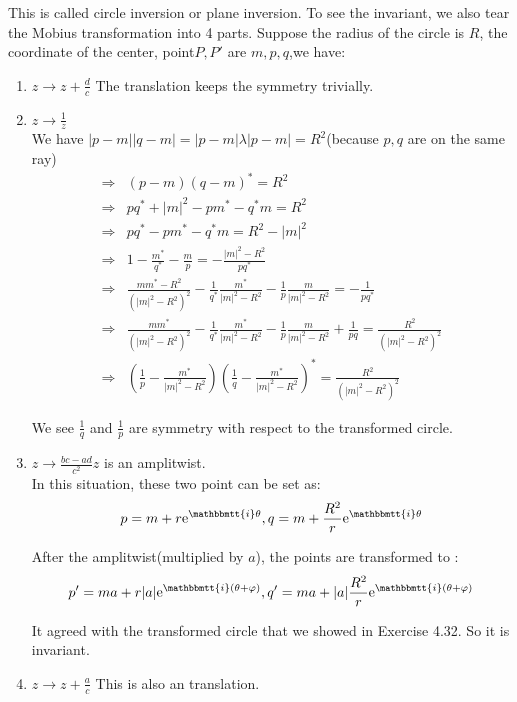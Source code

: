 \documentclass[]{ctexart}
\newcommand{\mi}{\mathbbmtt{i}}
\newcommand{\me}{\mathrm{e}}
\begin{document}
		This is called circle inversion or plane inversion. To see the invariant, we also tear the Mobius transformation into 4 parts. Suppose the radius of the circle is $R$, the coordinate of the center, point$P,P'$ are $m,p,q$,we have:
			\begin{enumerate}
				\item $z\rightarrow z+\frac{d}{c}$ The translation keeps the symmetry trivially. 
				\item $z\rightarrow \frac{1}{z}$\\
				 We have $ |p-m||q-m|= |p-m|\lambda|p-m|=R^2 $(because $p,q$ are on the same ray)\\
				 	\begin{equation*}
				 	\begin{aligned}
				 		\Rightarrow& (p-m)(q-m)^*=R^2\\
				 		\Rightarrow& p q^{*}+|m|^{2}-p m^{*}-q^{*} m=R^{2} \\
				 		\Rightarrow& p q^{*}-p m^{*}-q^{*} m=R^{2}-|m|^{2} \\
				 		\Rightarrow& 1-\frac{m^{*}}{q^{*}}-\frac{m}{p}=-\frac{|m|^{2}-R^{2}}{p q^{*}} \\
				 		\Rightarrow& \frac{m m^{*}-R^{2} }{\left(|m|^{2}-R^{2}\right)^{2}}-\frac{1}{q^{*}} \frac{m^{*}}{|m|^{2}-R^{2}}-\frac{1}{p} \frac{m}{|m|^{2}-R^{2}}=-\frac{1}{p q^{*}} \\
				 		\Rightarrow& \frac{m m^{*}}{\left(|m|^{2}-R^{2}\right)^{2}}-\frac{1}{q^{*}} \frac{m^{*}}{|m|^{2}-R^{2}}-\frac{1}{p} \frac{m}{|m|^{2}-R^{2}}+\frac{1}{p q}=\frac{R^{2}}{\left(|m|^{2}-R^{2}\right)^{2}} \\
				 		\Rightarrow& \left(\frac{1}{p}-\frac{m^{*}}{|m|^{2}-R^{2}}\right)\left(\frac{1}{q}-\frac{m^{*}}{| m|^{2}-R^{2}}\right)^{*}=\frac{R^{2}}{\left(|m|^{2}-R^{2}\right)^{2}}
				 	\end{aligned}
				 	\end{equation*}
				 	
				 	We see $\frac{1}{q}$ and $\frac{1}{p}$ are symmetry with respect to the transformed circle.  
				 	
				\item $z\rightarrow \frac{bc-ad}{c^2}z$ is an amplitwist. \\
				In this situation, these two point can be set as: 
					\begin{equation*}
						p=m+r\me^{\mi \theta},q=m+\frac{R^2}{r}\me^{\mi \theta}
					\end{equation*}
				
				After the amplitwist(multiplied by $a$), the points are transformed to :
					\begin{equation*}
					\begin{aligned}
						p'=ma+r|a|\me^{\mi (\theta+\varphi)},q'=ma+|a|\frac{R^2}{r}\me^{\mi (\theta+\varphi)}
					\end{aligned}
					\end{equation*}
					
				It agreed with the transformed circle that we showed in Exercise 4.32. So it is invariant. 
				\item $z\rightarrow  z+\frac{a}{c}$ This is also an translation. 
			\end{enumerate}
		
\end{document}
